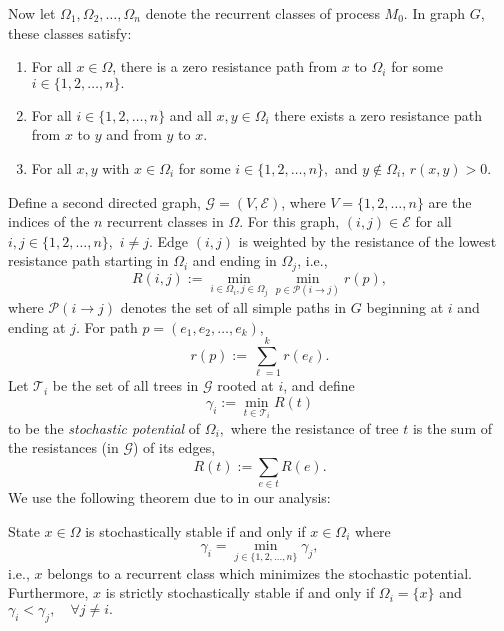 Now let $\Omega_1,\Omega_2,\ldots,\Omega_n$ denote the recurrent classes of process $M_0.$ In graph $G$, these classes satisfy:
\begin{enumerate}[leftmargin=1.5em]
\item For all $x\in \Omega$, there is a zero resistance path from $x$ to $\Omega_i$ for some $i\in \{1,2,\ldots,n\}.$
\item For all $i\in \{1,2,\ldots,n\}$ and all $x,y\in \Omega_i$ there exists a zero resistance path from $x$ to $y$ and from $y$ to $x$.
\item For all $x,y$ with $x\in \Omega_i$ for some $i\in \{1,2,\ldots,n\},$ and $y\notin \Omega_i$, $r(x,y) >0.$ %
\end{enumerate}
Define a second directed graph, $\mathcal{G} = (V,\mathcal{E})$, where $V = \{1,2,\ldots,n\}$ are the indices of the $n$ recurrent classes in $\Omega.$ For this graph, $(i,j)\in \mathcal{E}$ for all $i,j\in \{1,2,\ldots,n\},$ $i\neq j.$ Edge $(i,j)$ is weighted by the resistance of the lowest resistance path starting in $\Omega_i$ and ending in $\Omega_j$, i.e., 
\begin{equation}
R(i,j):=\min_{i\in \Omega_i,j\in\Omega_j}\min_{p\in \mathcal{P}(i\to j)} r(p),
\end{equation}
where $\mathcal{P}(i\to j)$ denotes the set of all simple paths in $G$ beginning at $i$ and ending at $j$. For path $p = (e_1,e_2,\ldots,e_k)$, 
\begin{equation}
r(p):= \sum_{\ell = 1}^k r(e_\ell).
\end{equation}
Let $\mathcal{T}_i$ be the set of all trees in $\mathcal{G}$ rooted at $i$, and define 
\begin{equation}
\gamma_i := \min_{t\in \mathcal{T}_i} R(t)
\end{equation}
to be the \emph{stochastic potential} of $\Omega_i,$ where the resistance of tree $t$ is the sum of the resistances (in $\mathcal{G}$) of its edges,
\begin{equation}
R(t) := \sum_{e\in t} R(e).
\end{equation}
We use the following theorem due to \cite{Young1993} in our analysis:
\begin{Theorem}\label{t:resistance trees theorem}
State $x\in \Omega$ is stochastically stable if and only if $x\in \Omega_i$ where 
\begin{equation}
\gamma_i = \min_{j\in \{1,2,\ldots,n\}}\gamma_j,
\end{equation}
i.e., $x$ belongs to a recurrent class which minimizes the stochastic potential. 
Furthermore, $x$ is strictly stochastically stable if and only if $\Omega_i = \{x\}$ and 
$\gamma_i<\gamma_j,\quad\forall j\neq i.$
\end{Theorem}



